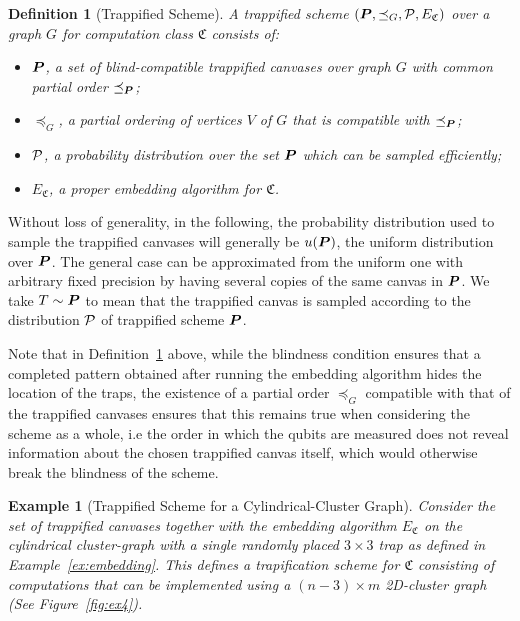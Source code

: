 \documentclass[12pt]{iopart}
\renewcommand{\1}{\mathds{1}}
\newtheorem{definition}{Definition}
\newtheorem{example}{Example}
\begin{document}
\begin{definition}[Trappified Scheme]
\label{def:trap-scheme}
A \emph{trappified scheme} $(\bm{P}, \preceq_G, \mathcal{P}, E_{\mathfrak{C}})$ over a graph $G$ for computation class $\mathfrak{C}$ consists of:
\begin{itemize}
\item $\bm{P}$, a set of \emph{blind-compatible} trappified canvases over graph $G$ with common partial order $\preceq_{\bm{P}}$;
\item $\preceq_G$, a partial ordering of vertices $V$ of $G$ that is compatible with $\preceq_{\bm{P}}$;
\item $\mathcal{P}$, a probability distribution over the set $\bm{P}$ which can be sampled efficiently;
\item $E_{\mathfrak{C}}$, a \emph{proper} embedding algorithm for $\mathfrak{C}$.
\end{itemize}
\end{definition}

Without loss of generality, in the following, the probability distribution used to sample the trappified canvases will generally be $u(\bm{P})$, the uniform distribution over $\bm{P}$.
The general case can be approximated from the uniform one with arbitrary fixed precision by having several copies of the same canvas in $\bm{P}$.
We take $T \sim \bm{P}$ to mean that the trappified canvas is sampled according to the distribution $\mathcal{P}$ of trappified scheme $\bm{P}$.

Note that in Definition~\ref{def:trap-scheme} above, while the blindness condition ensures that a completed pattern obtained after running the embedding algorithm hides the location of the traps, the existence of a partial order $\preceq_{G}$ compatible with that of the trappified canvases ensures that this remains true when considering the scheme as a whole, i.e the order in which the qubits are measured does not reveal information about the chosen trappified canvas itself, which would otherwise break the blindness of the scheme. 

\begin{example}[Trappified Scheme for a Cylindrical-Cluster Graph]
  Consider the set of trappified canvases together with the embedding algorithm $E_{\mathfrak C}$ on the cylindrical cluster-graph with a single randomly placed $3 \times 3$ trap as defined in Example~\ref{ex:embedding}. This defines a trapification scheme for $\mathfrak{C}$ consisting of computations that can be implemented using a $(n-3)\times m$ 2D-cluster graph (See Figure~\ref{fig:ex4}).
\end{example}
\end{document}
